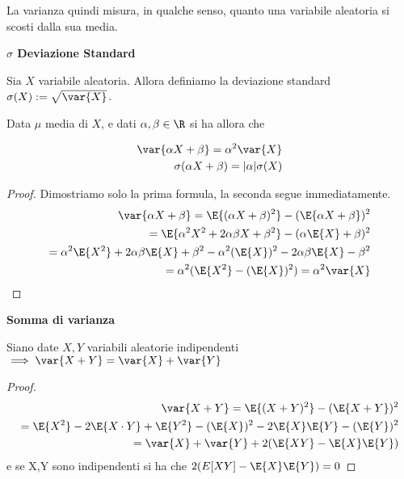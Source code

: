 La varianza quindi misura, in qualche senso, quanto una variabile aleatoria si scosti dalla sua media.

\begin{defn}
    \textbf{$\sigma$ Deviazione Standard}
    
    Sia $ X $ variabile aleatoria. Allora definiamo la deviazione standard $ \sigma(X) := \sqrt{\var{X}} $. 
\end{defn}
\begin{prop}
	Data $ \mu $ media di $ X $, e dati $ \alpha, \beta \in \R $ si ha allora che

	\begin{equation*}
		\begin{aligned}
			\var{\alpha X + \beta} = \alpha ^2 \var{X} \\
			 \sigma(\alpha X + \beta) =| \alpha| \sigma(X) 
					\end{aligned}
	\end{equation*}
\end{prop}
\begin{proof}
Dimostriamo solo la prima formula, la seconda segue immediatamente.
\begin{equation*}
		\begin{aligned}
	    	\var{\alpha X + \beta}
          = \E{(\alpha X + \beta)^2} - (\E{\alpha X + \beta})^2 \\
			= \E{\alpha^2 X^2 + 2 \alpha \beta X + \beta^2} - (\alpha \E{X} + \beta)^2 \\
			=\alpha^2 \E{ X^2} + 2 \alpha \beta  \E{ X} + \beta^2 -
			\alpha^2 (\E{X})^2 -2 \alpha \beta  \E{ X} - \beta^2 \\
			= \alpha^2 (\E{X^2} - (\E{X})^2) = \alpha^2 \var{X}
        \end{aligned}
	\end{equation*}


\end{proof}

\begin{defn}
    \textbf{Somma di varianza} 
    
    Siano date $ X,Y $ variabili aleatorie indipendenti $ \implies \var{X + Y} = \var{X} + \var{Y} $ 
    
    \begin{proof}
		\begin{equation*}
		\begin{aligned}
		\var{X+Y} = \E{(X+Y)^2} - (\E{X+Y})^2 \\
		= \E{X^2} - 2\E{X \cdot Y} + \E{Y^2}-(\E{X})^2 - 2\E{X}\E{Y} - (\E{Y})^2 \\
		= \var{X} + \var{Y} + 2(\E{XY} - \E{X}\E{Y})\\
		\end{aligned}
		\end{equation*}
    e se X,Y sono indipendenti si ha che	$2(E[XY] - \E{X}\E{Y}) = 0$
	\end{proof}
    
\end{defn}


